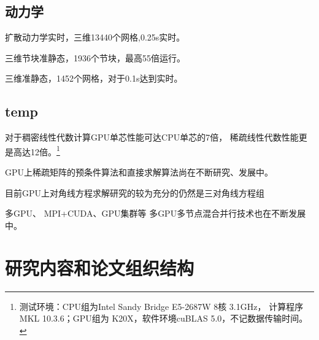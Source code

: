 \subsection{动力学}

扩散动力学实时，三维13440个网格,0.25s实时。\cite{宋英明2010}

三维节块准静态，1936个节块，最高55倍运行。\cite{丁小川2011}

三维准静态，1452个网格，对于0.1s达到实时。\cite{齐克林1996}


\subsection{temp}
对于稠密线性代数计算GPU单芯性能可达CPU单芯的7倍，
稀疏线性代数性能更是高达12倍。\footnote{测试环境：CPU组为Intel Sandy Bridge E5-2687W 8核 3.1GHz，
计算程序MKL 10.3.6；GPU组为 K20X，软件环境cuBLAS 5.0，不记数据传输时间。}
\cite{WillGTC2013}

GPU上稀疏矩阵的预条件算法和直接求解算法尚在不断研究、发展中。\cite{KyleGTC2013}

目前GPU上对角线方程求解研究的较为充分的仍然是三对角线方程组\cite{LiWenChangGTC2013}

多GPU\cite{LeviGTC2013}、
MPI+CUDA\cite{Jiri2013}、GPU集群\cite{StefanGTC2013}等
多GPU多节点混合并行技术也在不断发展中。

\section{研究内容和论文组织结构}
